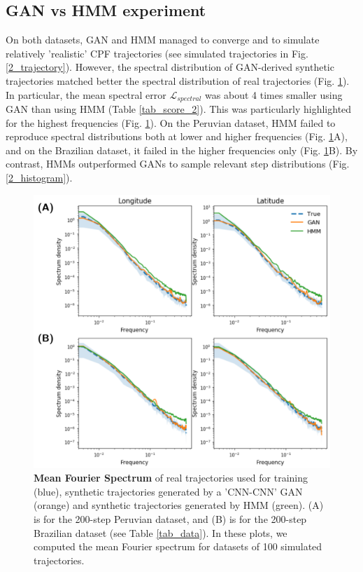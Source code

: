 \documentclass{article}
\begin{document}
\subsection{GAN vs HMM experiment}
On both datasets, GAN and HMM managed to converge and to simulate relatively 'realistic' CPF trajectories (see simulated trajectories in Fig. \ref{2_trajectory}). However, the spectral distribution of GAN-derived synthetic trajectories matched better the spectral distribution of real trajectories (Fig. \ref{2_spectrum}). In particular, the mean spectral error  $\mathcal{L}_{spectral}$ was about 4 times smaller using GAN than using HMM (Table \ref{tab_score_2}). This was particularly highlighted for the highest frequencies (Fig. \ref{2_spectrum}). On the Peruvian dataset, HMM failed to reproduce spectral distributions both at lower and higher frequencies (Fig. \ref{2_spectrum}A), and on the Brazilian dataset, it failed in the higher frequencies only (Fig. \ref{2_spectrum}B). By contrast, HMMs outperformed GANs to sample
relevant step  distributions (Fig. \ref{2_histogram}).

\begin{figure}[h]
  \centering
  \includegraphics[scale=0.5]{2_spectrum.png}
  \caption{\textbf{Mean Fourier Spectrum} of real trajectories used for training (blue), synthetic trajectories generated by a 'CNN-CNN' GAN (orange) and synthetic trajectories generated by HMM (green). (A) is for the 200-step Peruvian dataset, and (B) is for the 200-step Brazilian dataset (see Table \ref{tab_data}). In these plots, we computed the mean Fourier spectrum for datasets of 100 simulated trajectories.  }
  \label{2_spectrum}
\end{figure}
\end{document}
